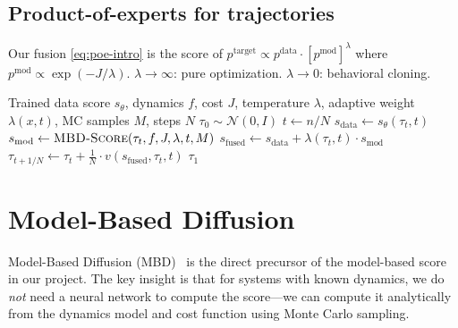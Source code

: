 \documentclass[11pt,letterpaper]{article}
\theoremstyle{plain}
\theoremstyle{definition}
\theoremstyle{remark}
\newcommand{\calN}{\mathcal{N}}
\begin{document}
\subsection{Product-of-experts for trajectories}

Our fusion \eqref{eq:poe-intro} is the score of
$p^{\mathrm{target}}\propto p^{\mathrm{data}}\cdot[p^{\mathrm{mod}}]^\lambda$
where $p^{\mathrm{mod}}\propto\exp(-J/\lambda)$.
$\lambda\to\infty$: pure optimization. $\lambda\to 0$: behavioral cloning.

\begin{algorithm}[ht]
\caption{Product-of-Experts Fused Trajectory Generation (Ours)}\label{alg:poe-fused}
\begin{algorithmic}[1]
\Require Trained data score $s_\theta$, dynamics $f$, cost $J$, temperature $\lambda$,
  adaptive weight $\lambda(x,t)$, MC samples $M$, steps $N$
\State $\tau_0\sim\calN(0,I)$ 
  \State $t\gets n/N$
  \State $s_\mathrm{data}\gets s_\theta(\tau_t,t)$
  \State $s_\mathrm{mod}\gets\textsc{MBD-Score}(\tau_t,f,J,\lambda,t,M)$
  \State $s_\mathrm{fused}\gets s_\mathrm{data}+\lambda(\tau_t,t)\cdot s_\mathrm{mod}$
  \State $\tau_{t+1/N}\gets\tau_t+\frac{1}{N}\cdot v(s_\mathrm{fused},\tau_t,t)$
\EndFor
\State \Return $\tau_1$ 
\end{algorithmic}
\end{algorithm}

\section{Model-Based Diffusion}\label{sec:mbd}

Model-Based Diffusion (MBD)~\citep{mbd} is the direct precursor of
the model-based score in our project.  The key insight is that for
systems with known dynamics, we do \emph{not} need a neural network to
compute the score---we can compute it analytically from the dynamics
model and cost function using Monte Carlo sampling.
\end{document}
